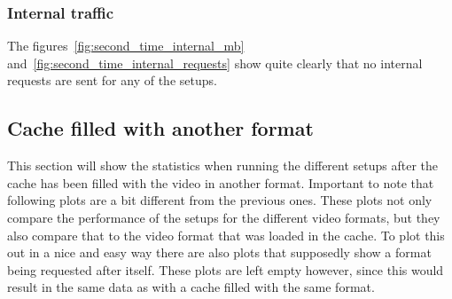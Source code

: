 \documentclass[twoside,openright]{uva-bachelor-thesis}
\begin{document}
\subsubsection{Internal traffic}
The figures~\ref{fig:second_time_internal_mb}
and~\ref{fig:second_time_internal_requests} show quite clearly that no internal
requests are sent for any of the setups.




\FloatBarrier
\subsection{Cache filled with another format}
This section will show the statistics when running the different setups after
the cache has been filled with the video in another format.
Important to note that following plots are a bit different from the previous
ones. These plots not only compare the performance of the setups for the
different video formats, but they also compare that to the video format that was
loaded in the cache. To plot this out in a nice and easy way there are also
plots that supposedly show a format being requested after itself. These plots
are left empty however, since this would result in the same data as with a cache
filled with the same format.
\end{document}
